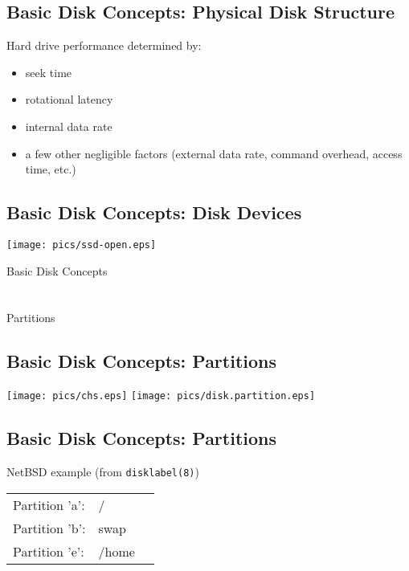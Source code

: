\documentclass[xga]{xdvislides}
\begin{document}
\subsection{Basic Disk Concepts: Physical Disk Structure}
Hard drive performance determined by:
\begin{itemize}
	\item seek time
	\item rotational latency
	\item internal data rate
	\item a few other negligible factors (external data rate, command
		overhead, access time, etc.)
\end{itemize}

\subsection{Basic Disk Concepts: Disk Devices}
\begin{center}
	\texttt{[image: pics/ssd-open.eps]} \\
\end{center}


\newpage
\vspace*{\fill}
\begin{center}
	\Hugesize
		Basic Disk Concepts\\ [1em]
	\hspace*{5mm}
	\blueline\\
	\hspace*{5mm}\\
		Partitions
\end{center}
\vspace*{\fill}

\subsection{Basic Disk Concepts: Partitions}
	\begin{center}
		\texttt{[image: pics/chs.eps]}
		\texttt{[image: pics/disk.partition.eps]} \\
	\end{center}



\subsection{Basic Disk Concepts: Partitions}
NetBSD example (from {\tt disklabel(8)})

\begin{tabular}{ l l c }
Partition 'a': & / & \\
Partition 'b': & swap & \\
Partition 'e': & /home & \\
\end{tabular}
\end{document}
